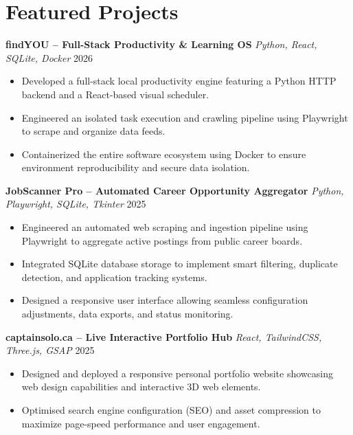 \documentclass[a4paper,10pt]{article}
\begin{document}
\section*{Featured Projects}
\textbf{findYOU -- Full-Stack Productivity \& Learning OS} \enspace\textbar\enspace \textit{Python, React, SQLite, Docker} \hfill 2026 \\
\begin{itemize}
    \item Developed a full-stack local productivity engine featuring a Python HTTP backend and a React-based visual scheduler.
    \item Engineered an isolated task execution and crawling pipeline using Playwright to scrape and organize data feeds.
    \item Containerized the entire software ecosystem using Docker to ensure environment reproducibility and secure data isolation.
\end{itemize}

\vspace{3pt}
\textbf{JobScanner Pro -- Automated Career Opportunity Aggregator} \enspace\textbar\enspace \textit{Python, Playwright, SQLite, Tkinter} \hfill 2025 \\
\begin{itemize}
    \item Engineered an automated web scraping and ingestion pipeline using Playwright to aggregate active postings from public career boards.
    \item Integrated SQLite database storage to implement smart filtering, duplicate detection, and application tracking systems.
    \item Designed a responsive user interface allowing seamless configuration adjustments, data exports, and status monitoring.
\end{itemize}

\vspace{3pt}
\textbf{captainsolo.ca -- Live Interactive Portfolio Hub} \enspace\textbar\enspace \textit{React, TailwindCSS, Three.js, GSAP} \hfill 2025 \\
\begin{itemize}
    \item Designed and deployed a responsive personal portfolio website showcasing web design capabilities and interactive 3D web elements.
    \item Optimised search engine configuration (SEO) and asset compression to maximize page-speed performance and user engagement.
\end{itemize}
\end{document}
